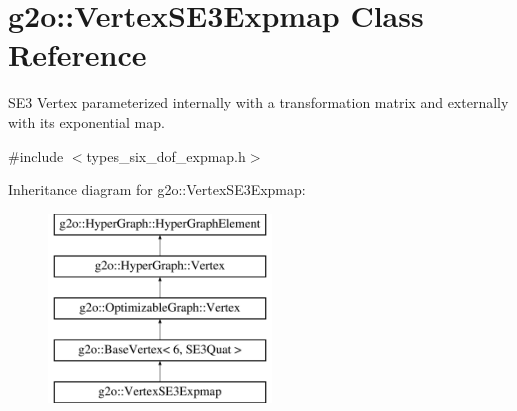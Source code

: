 \hypertarget{classg2o_1_1_vertex_s_e3_expmap}{}\section{g2o\+:\+:Vertex\+S\+E3\+Expmap Class Reference}
\label{classg2o_1_1_vertex_s_e3_expmap}


S\+E3 Vertex parameterized internally with a transformation matrix and externally with its exponential map.  




{\ttfamily \#include $<$types\+\_\+six\+\_\+dof\+\_\+expmap.\+h$>$}

Inheritance diagram for g2o\+:\+:Vertex\+S\+E3\+Expmap\+:\begin{figure}[H]
\begin{center}
\leavevmode
\includegraphics[height=5.000000cm]{classg2o_1_1_vertex_s_e3_expmap}
\end{center}
\end{figure}
